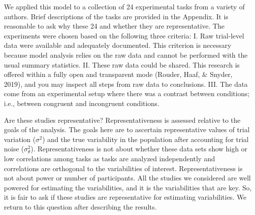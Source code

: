 \documentclass[
  english,
  ,man]{apa6}
\begin{document}
We applied this model to a collection of 24 experimental tasks from a variety of authors. Brief descriptions of the tasks are provided in the Appendix. It is reasonable to ask why these 24 and whether they are representative.
The experiments were chosen based on the following three criteria: I. Raw trial-level data were available and adequately documented. This criterion is necessary because model analysis relies on the raw data and cannot be performed with the usual summary statistics. II. These raw data could be shared. This research is offered within a fully open and transparent mode (Rouder, Haaf, \& Snyder, 2019), and you may inspect all steps from raw data to conclusions. III. The data come from an experimental setup where there was a contrast between conditions; i.e., between congruent and incongruent conditions.

Are these studies representative? Representativeness is assessed relative to the goals of the analysis. The goals here are to ascertain representative values of trial variation (\(\sigma^2\)) and the true variability in the population after accounting for trial noise (\(\sigma^2_\theta\)). Representativeness is not about whether these data sets show high or low correlations among tasks as tasks are analyzed independently and correlations are orthogonal to the variabilities of interest. Representativeness is not about power or number of participants. All the studies we considered are well powered for estimating the variabilities, and it is the variabilities that are key. So, it is fair to ask if these studies are representative for estimating variabilities. We return to this question after describing the results.
\end{document}
